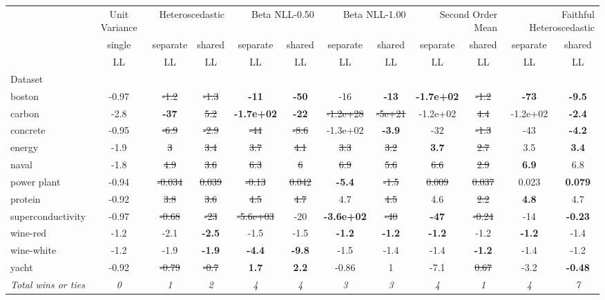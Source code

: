 \begin{tabular}{l|c|cc|cc|cc|cc|cc}
\toprule
{} & {Unit Variance} & \multicolumn{2}{r}{Heteroscedastic} & \multicolumn{2}{r}{Beta NLL-0.50} & \multicolumn{2}{r}{Beta NLL-1.00} & \multicolumn{2}{r}{Second Order Mean} & \multicolumn{2}{r}{Faithful Heteroscedastic} \\
{} & {single} & {separate} & {shared} & {separate} & {shared} & {separate} & {shared} & {separate} & {shared} & {separate} & {shared} \\
{} & {LL} & {LL} & {LL} & {LL} & {LL} & {LL} & {LL} & {LL} & {LL} & {LL} & {LL} \\
{Dataset} & {} & {} & {} & {} & {} & {} & {} & {} & {} & {} & {} \\
\midrule
boston & -0.97 & \sout{-1.2} & \sout{-1.3} & \textbf{-11} & \textbf{-50} & -16 & \textbf{-13} & \textbf{-1.7e+02} & \sout{-1.2} & \textbf{-73} & \textbf{-9.5} \\
carbon & -2.8 & \textbf{-37} & \sout{5.2} & \textbf{-1.7e+02} & \textbf{-22} & \sout{-1.2e+28} & \sout{-5e+21} & -1.2e+02 & \sout{4.4} & -1.2e+02 & \textbf{-2.4} \\
concrete & -0.95 & \sout{-6.9} & \sout{-2.9} & \sout{-44} & \sout{-8.6} & -1.3e+02 & \textbf{-3.9} & -32 & \sout{-1.3} & -43 & \textbf{-4.2} \\
energy & -1.9 & \sout{3} & \sout{3.4} & \sout{3.7} & \sout{4.1} & \sout{3.3} & \sout{3.2} & \textbf{3.7} & \sout{2.7} & 3.5 & \textbf{3.4} \\
naval & -1.8 & \sout{4.9} & \sout{3.6} & \sout{6.3} & \sout{6} & \sout{6.9} & \sout{5.6} & \sout{6.6} & \sout{2.9} & \textbf{6.9} & 6.8 \\
power plant & -0.94 & \sout{-0.034} & \sout{0.039} & \sout{-0.13} & \sout{0.042} & \textbf{-5.4} & \sout{-1.5} & \sout{0.009} & \sout{0.037} & 0.023 & \textbf{0.079} \\
protein & -0.92 & \sout{3.8} & \sout{3.6} & \sout{4.5} & \sout{4.7} & 4.7 & \sout{4.5} & 4.6 & \sout{2.2} & \textbf{4.8} & 4.7 \\
superconductivity & -0.97 & \sout{-0.68} & \sout{-23} & \sout{-5.6e+03} & -20 & \textbf{-3.6e+02} & \sout{-40} & \textbf{-47} & \sout{-0.24} & -14 & \textbf{-0.23} \\
wine-red & -1.2 & -2.1 & \textbf{-2.5} & -1.5 & -1.5 & \textbf{-1.2} & \textbf{-1.2} & \textbf{-1.2} & -1.2 & \textbf{-1.2} & -1.4 \\
wine-white & -1.2 & -1.9 & \textbf{-1.9} & \textbf{-4.4} & \textbf{-9.8} & -1.5 & -1.4 & -1.4 & \textbf{-1.2} & -1.4 & -1.2 \\
yacht & -0.92 & \sout{-0.79} & \sout{-0.7} & \textbf{1.7} & \textbf{2.2} & -0.86 & 1 & -7.1 & \sout{0.67} & -3.2 & \textbf{-0.48} \\
\textit{{Total wins or ties}} & \textit{0} & \textit{1} & \textit{2} & \textit{4} & \textit{4} & \textit{3} & \textit{3} & \textit{4} & \textit{1} & \textit{4} & \textit{7} \\
\bottomrule
\end{tabular}
